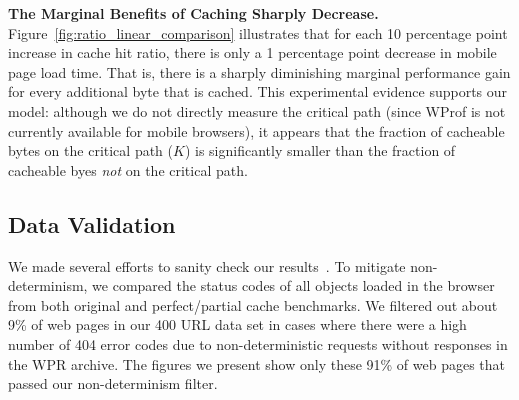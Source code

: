 {\bf The Marginal Benefits of Caching Sharply Decrease.}
Figure~\ref{fig:ratio_linear_comparison} illustrates that for each 10 percentage point increase in cache hit ratio, there is only
a 1 percentage point decrease in mobile page load time.
That is, there is a sharply diminishing marginal performance gain for 
every additional byte that is cached.
This experimental evidence supports our model:
although we do not directly measure the critical path (since WProf is not currently available for mobile browsers), it appears that the fraction of cacheable bytes on the critical path ($K$) is
significantly smaller than the fraction of cacheable byes {\it not} on
the critical path.

% 


\subsection{Data Validation}
\label{subsec:validation}
We made several efforts to sanity check our results~\cite{sanity-checks}. To
mitigate non-determinism, we compared the status codes of all objects loaded
in the browser from both original and perfect/partial cache benchmarks. We
filtered out about 9\% of web pages in our 400 URL data set in cases where
there were a high number of 404 error codes due to non-deterministic requests
without responses in the WPR archive. The figures we present show only these
91\% of web pages that passed our non-determinism filter.

